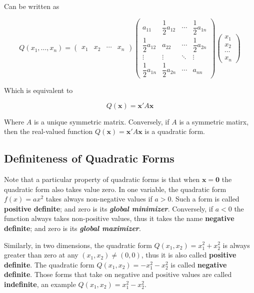 \documentclass[11pt]{article}
\begin{document}
Can be written as

\[
Q(x_1, \ldots, x_n) = \begin{pmatrix} x_1 & x_2 & \cdots & x_n \end{pmatrix} \begin{pmatrix} a_{11} & \dfrac{1}{2}a_{12} & \cdots & \dfrac{1}{2} a_{1n} \\ \dfrac{1}{2}a_{12} & a_{22} & \cdots & \dfrac{1}{2}a_{2n}\\ \vdots & \vdots & \ddots & \vdots \\ \dfrac{1}{2}a_{1n} & \dfrac{1}{2} a_{2n} & \cdots & a_{nn}\end{pmatrix} \begin{pmatrix} x_1 \\ x_2 \\ \cdots \\ x_n \end{pmatrix}
\]

Which is equivalent to

\[
Q(\mathbf{x}) = \mathbf{x}'A\mathbf{x}
\]

Where \(A\) is a unique symmetric matrix. Conversely, if \(A\) is a
symmetric matirx, then the real-valued function
\(Q(\mathbf{x}) = \mathbf{x}'A\mathbf{x}\) is a quadratic form.

\hypertarget{definiteness-of-quadratic-forms}{%
\subsection{Definiteness of Quadratic
Forms}\label{definiteness-of-quadratic-forms}}

Note that a particular property of quadratic forms is that when
\(\mathbf{x} = \mathbf{0}\) the quadratic form also takes value zero. In
one variable, the quadratic form \(f(x) = ax^2\) takes always
non-negative values if \(a > 0\). Such a form is called \textbf{positive
definite}; and zero is its \textbf{\emph{global minimizer}}. Conversely,
if \(a < 0\) the function always takes non-positive values, thus it
takes the name \textbf{negative definite}; and zero is its
\textbf{\emph{global maximizer}}.

Similarly, in two dimensions, the quadratic form
\(Q(x_1, x_2) = x_1^2 + x_2^2\) is always greater than zero at any
\((x_1, x_2) \neq (0, 0)\), thus it is also called \textbf{positive
definite}. The quadratic form \(Q(x_1, x_2) = - x_1^2 - x_2^2\) is
called \textbf{negative definite}. Those forms that take on negative and
positive values are called \textbf{indefinite}, an example
\(Q(x_1, x_2) = x_1^2 - x_2^2\).
\end{document}
